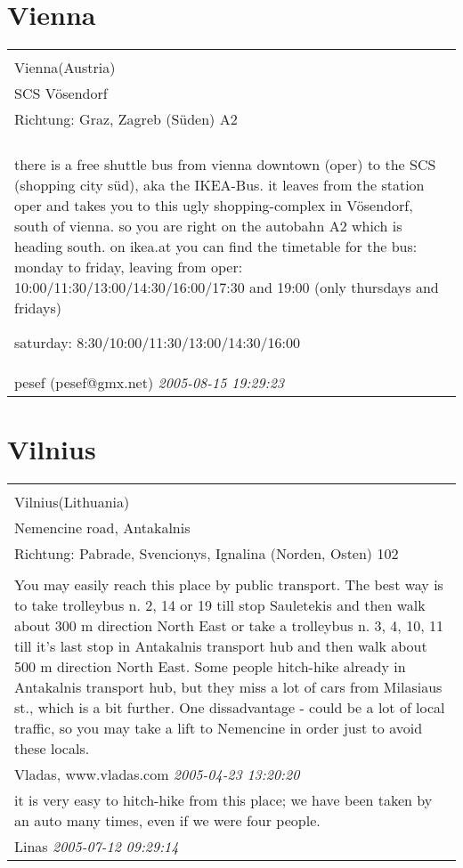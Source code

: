 \documentclass[a4paper,12pt]{article}
\begin{document}
\section{Vienna}
\begin{tabular}{|p{13cm}|}
\hline\\
Vienna(Austria)\\
SCS Vösendorf\\
Richtung: Graz, Zagreb (Süden) A2 \\
\hline\\
there is a free shuttle bus from vienna downtown (oper) to the SCS (shopping city süd), aka the IKEA-Bus. it leaves from the station oper and takes you to this ugly shopping-complex in Vösendorf, south of vienna. so you are right on the autobahn A2 which is heading south. on ikea.at you can find the timetable for the bus:
monday to friday, leaving from oper:
10:00/11:30/13:00/14:30/16:00/17:30
and 19:00 (only thursdays and fridays)

saturday: 8:30/10:00/11:30/13:00/14:30/16:00 \\
pesef (pesef@gmx.net) \textit{ 2005-08-15 19:29:23 }\\\hline
\end{tabular}


\section{Vilnius}
\begin{tabular}{|p{13cm}|}
\hline\\
Vilnius(Lithuania)\\
Nemencine road, Antakalnis\\
Richtung: Pabrade, Svencionys, Ignalina (Norden, Osten) 102 \\
\hline\\
You may easily reach this place by public transport. The best way is to take trolleybus n. 2, 14 or 19 till stop Sauletekis and then walk about 300 m direction North East or take a trolleybus n. 3, 4, 10, 11 till it's last stop in Antakalnis transport hub and then walk about 500 m direction North East.
Some people hitch-hike already in Antakalnis transport hub, but they miss a lot of cars from Milasiaus st., which is a bit further.
One dissadvantage - could be a lot of local traffic, so you may take a lift to Nemencine in order just to avoid these locals. \\
Vladas, www.vladas.com \textit{ 2005-04-23 13:20:20 }\\\hline it is very easy to hitch-hike from this place; we have been taken by an auto many times, even if we were four people. \\
Linas \textit{ 2005-07-12 09:29:14 }\\\hline
\end{tabular}
\end{document}
